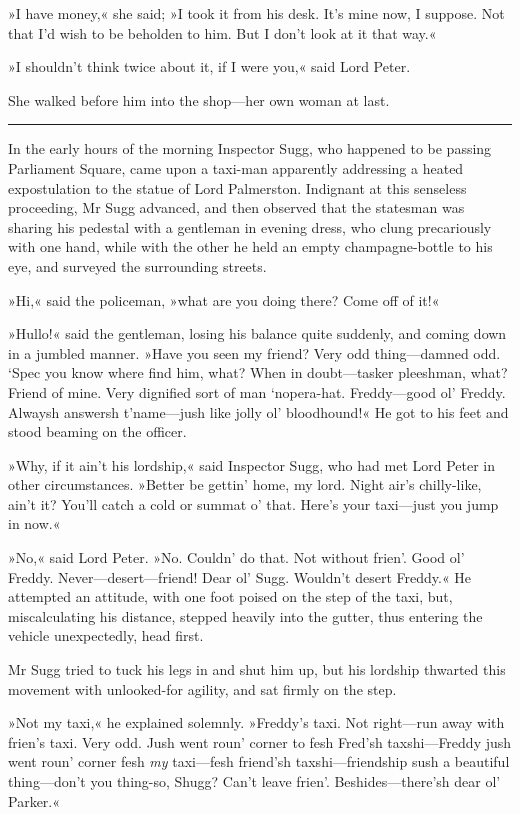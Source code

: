 »I have money,« she said; »I took it from his desk. It's mine now, I suppose. Not that I'd wish to be beholden to him. But I don't look at it that way.«

»I shouldn't think twice about it, if I were you,« said Lord Peter.

She walked before him into the shop—her own woman at last. 

\noindent\hfil\rule{0.5\textwidth}{.4pt}\hfil 

In the early hours of the morning Inspector Sugg, who happened to be passing Parliament Square, came upon a taxi-man apparently addressing a heated expostulation to the statue of Lord Palmerston. Indignant at this senseless proceeding, Mr Sugg advanced, and then observed that the statesman was sharing his pedestal with a gentleman in evening dress, who clung precariously with one hand, while with the other he held an empty champagne-bottle to his eye, and surveyed the surrounding streets.

»Hi,« said the policeman, »what are you doing there? Come off of it!«

»Hullo!« said the gentleman, losing his balance quite suddenly, and coming down in a jumbled manner. »Have you seen my friend? Very odd thing—damned odd. `Spec you know where find him, what? When in doubt—tasker pleeshman, what? Friend of mine. Very dignified sort of man `nopera-hat. Freddy—good ol' Freddy. Alwaysh answersh t'name—jush like jolly ol' bloodhound!« He got to his feet and stood beaming on the officer.

»Why, if it ain't his lordship,« said Inspector Sugg, who had met Lord Peter in other circumstances. »Better be gettin' home, my lord. Night air's chilly-like, ain't it? You'll catch a cold or summat o' that.  Here's your taxi—just you jump in now.«

»No,« said Lord Peter. »No. Couldn' do that. Not without frien'. Good ol' Freddy. Never—desert—friend! Dear ol' Sugg. Wouldn't desert Freddy.« He attempted an attitude, with one foot poised on the step of the taxi, but, miscalculating his distance, stepped heavily into the gutter, thus entering the vehicle unexpectedly, head first.

Mr Sugg tried to tuck his legs in and shut him up, but his lordship thwarted this movement with unlooked-for agility, and sat firmly on the step.

»Not my taxi,« he explained solemnly. »Freddy's taxi. Not right—run away with frien's taxi. Very odd. Jush went roun' corner to fesh Fred'sh taxshi—Freddy jush went roun' corner fesh \textit{my} taxi—fesh friend'sh taxshi—friendship sush a beautiful thing—don't you thing-so, Shugg? Can't leave frien'. Beshides—there'sh dear ol' Parker.«

